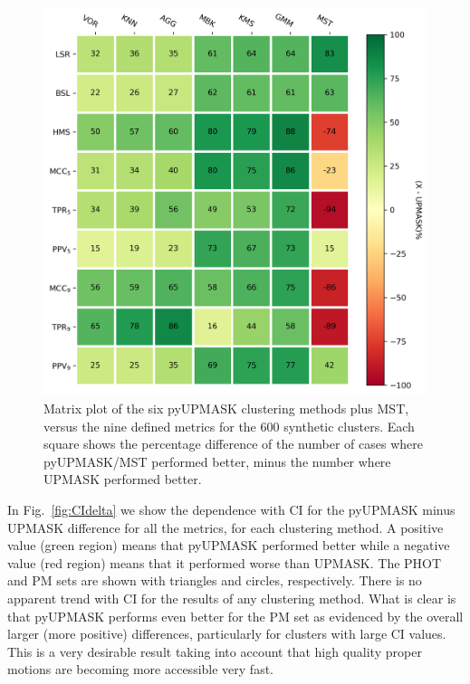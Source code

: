 \documentclass[draft]{aa}
\begin{document}
 \begin{figure}
 \includegraphics[width=\hsize]{figs/matrix.png}
 \caption{Matrix plot of the six pyUPMASK clustering methods plus MST, versus
 the nine defined metrics for the 600 synthetic clusters. Each square shows
 the percentage difference of the number of cases where pyUPMASK/MST performed
 better, minus the number where UPMASK performed better.}
 \label{fig:matrix}
 \end{figure}

 In Fig.~\ref{fig:CIdelta} we show the dependence with CI for the pyUPMASK
 minus UPMASK difference for all the metrics, for each clustering method. A
 positive value (green region) means that pyUPMASK performed better while a
 negative value (red region) means that it performed worse than UPMASK. The
 PHOT and PM sets are shown with triangles and circles, respectively.
 There is no apparent trend with CI for the results of any clustering method.
 What is clear is that pyUPMASK performs even better for the PM set as
 evidenced by the overall larger (more positive) differences, particularly for
 clusters with large CI values. This is a very desirable result taking into
 account that high quality proper motions are becoming more accessible very
 fast.\\
\end{document}
